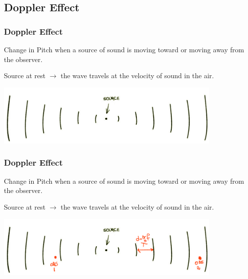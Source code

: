 \documentclass[]{beamer}
\begin{document}
\subsection{Doppler Effect}

\begin{frame}
\frametitle{Doppler Effect}

Change in Pitch when a source of sound is moving toward or moving away from the observer. 

\pause
\vspace{3mm}

Source at rest $\rightarrow$ the wave travels at the velocity of sound in the air.

\pause

  \begin{center}
  \includegraphics[height=1.2in]{images4/doppler1.jpg}
\end{center}


  \end{frame}






\begin{frame}
\frametitle{Doppler Effect}

Change in Pitch when a source of sound is moving toward or moving away from the observer. 

\vspace{3mm}

Source at rest $\rightarrow$ the wave travels at the velocity of sound in the air.



  \begin{center}
  \includegraphics[height=1.2in]{images4/doppler2.jpg}
\end{center}


  \end{frame}
\end{document}
